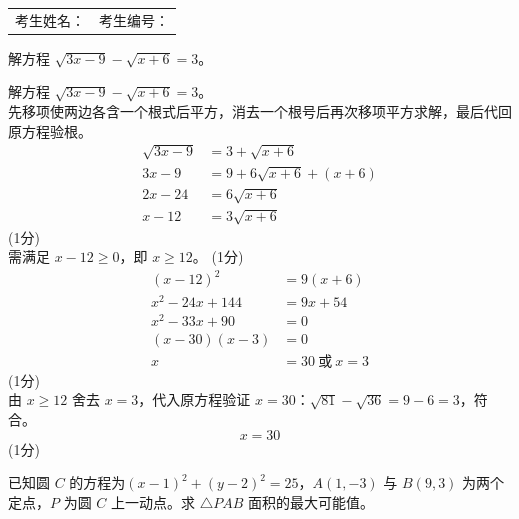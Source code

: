 \documentclass[12pt,a4paper]{exam-zh}
\newcommand{\qscoreoffset}{4em}
\newcommand{\qscore}[1]{%
    \leavevmode\unskip\nobreak\hfill
    \makebox[0pt][l]{\makebox[\qscoreoffset][r]{(#1\%)}}%
}
\begin{document}
    \vfill

    \begin{tabular*}{\linewidth}{@{\extracolsep{\fill}}ll}
    考生姓名：\underline{\hspace{4.2cm}} & 考生编号：\underline{\hspace{4.0cm}}
    \end{tabular*}


\newpage


\begin{question}[points = 4]
    解方程 $\sqrt{3x-9}-\sqrt{x+6}=3$。
    \qscore{4}
\end{question}

\begin{solution}
    解方程 $\sqrt{3x-9}-\sqrt{x+6}=3$。\\
    先移项使两边各含一个根式后平方，消去一个根号后再次移项平方求解，最后代回原方程验根。
    \begin{align*}
        \sqrt{3x-9} &= 3+\sqrt{x+6} \\
        3x-9 &= 9+6\sqrt{x+6}+(x+6) \\
        2x-24 &= 6\sqrt{x+6} \\
        x-12 &= 3\sqrt{x+6}
    \end{align*}
    \hfill (1分) \\
    需满足 $x-12\geq0$，即 $x\geq12$。
    \hfill (1分) \\
    \begin{align*}
        (x-12)^2 &= 9(x+6) \\
        x^2-24x+144 &= 9x+54 \\
        x^2-33x+90 &= 0 \\
        (x-30)(x-3) &= 0 \\
        x &= 30 \ \text{或} \ x=3
    \end{align*}
    \hfill (1分) \\
    由 $x\geq12$ 舍去 $x=3$，代入原方程验证 $x=30$：$\sqrt{81}-\sqrt{36}=9-6=3$，符合。
    \[
        x=30
    \]
    \hfill (1分)
\end{solution}

\begin{question}[points = 4]
    已知圆 $C$ 的方程为$(x-1)^2 + (y-2)^2 = 25$，$A(1,-3)$ 与 $B(9,3)$ 为两个定点，$P$ 为圆 $C$ 上一动点。求 $\triangle PAB$ 面积的最大可能值。
    \qscore{4}
\end{question}
\end{document}
